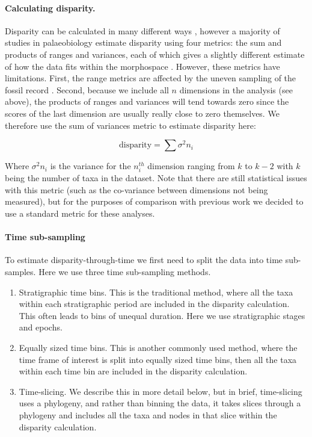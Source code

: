\documentclass[12pt,a4paper]{article}
\begin{document}
\paragraph{Calculating disparity.}
\label{disparity_calc}
Disparity can be calculated in many different ways \citep[e.g.][]{Wills1994,Ciampaglio2004,thorneresetting2011,hopkinsdecoupling2013,huang2015origins}, however a majority of studies in palaeobiology estimate disparity using four metrics: the sum and products of ranges and variances, each of which gives a slightly different estimate of how the data fits within the morphospace \citep{Foote01071994,Wills1994,brusatte50,Brusatte12092008,cisneros2010,thorneresetting2011,prentice2011,brusattedinosaur2012,toljagictriassic-jurassic2013,ruta2013,bentonmodels2014,bensonfaunal2014}.
However, these metrics have limitations. 
First, the range metrics are affected by the uneven sampling of the fossil record \citep{Butler2012}.
Second, because we include all $n$ dimensions in the analysis (see above), the products of ranges and variances will tend towards zero since the scores of the last dimension are usually really close to zero themselves. 
We therefore use the sum of variances metric to estimate disparity here:

\begin{equation}
\text{disparity} = \sum\sigma^{2}{n_i}
\end{equation}

Where $\sigma^{2}{n_i}$ is the variance for the $n_i^{th}$ dimension ranging from $k$ to $k-2$ with $k$ being the number of taxa in the dataset.
Note that there are still statistical issues with this metric (such as the co-variance between dimensions not being measured), but for the purposes of comparison with previous work we decided to use a standard metric for these analyses.

\paragraph{Time sub-sampling} 
\label{time_sub-samples}

To estimate disparity-through-time we first need to split the data into time sub-samples.
Here we use three time sub-sampling methods.

\begin{enumerate}
  \item Stratigraphic time bins. This is the traditional method, where all the taxa within each stratigraphic period are included in the disparity calculation. This often leads to bins of unequal duration. Here we use stratigraphic stages and epochs.
  \item Equally sized time bins. This is another commonly used method, where the time frame of interest is split into equally sized time bins, then all the taxa within each time bin are included in the disparity calculation. 
  \item Time-slicing. We describe this in more detail below, but in brief, time-slicing uses a phylogeny, and rather than binning the data, it takes slices through a phylogeny and includes all the taxa and nodes in that slice within the disparity calculation. 
\end{enumerate}  
\end{document}
